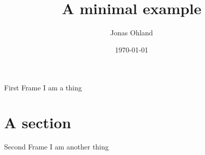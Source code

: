 \documentclass{beamer}
\title{A minimal example}
\author{Jonas Ohland}
\date{\today}
\begin{document}
	\maketitle
	\begin{frame}{First Frame}
		I am a thing
	\end{frame}
	\section{A section}
	\begin{frame}{Second Frame}
		I am another thing
	\end{frame}
\end{document}
